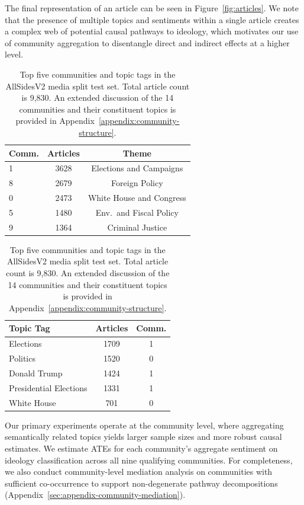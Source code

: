 The final representation of an article can be seen in Figure~\ref{fig:articles}. We note that the presence of multiple topics and sentiments within a single article creates a complex web of potential causal pathways to ideology, which motivates our use of community aggregation to disentangle direct and indirect effects at a higher level. 

\begin{table}[h]
    \centering
    \begin{minipage}{0.45\textwidth}
        \centering
        \small
        \begin{tabular}{lcc}
        \toprule
        \textbf{Comm.} & \textbf{Articles}  & \textbf{Theme} \\
        \midrule
        1 & 3628  & Elections and Campaigns \\
        8 & 2679  & Foreign Policy \\
        0 & 2473  & White House and Congress \\
        5 & 1480  & Env.\ and Fiscal Policy \\
        9 & 1364  & Criminal Justice \\
        \bottomrule
        \end{tabular}
    \end{minipage}
    \hfill
    \begin{minipage}{0.45\textwidth}
        \centering
        \small
        \begin{tabular}{lcc}
        \toprule
        \textbf{Topic Tag} & \textbf{Articles} & \textbf{Comm.} \\
        \midrule
        Elections & 1709 & 1 \\
        Politics & 1520 & 0 \\
        Donald Trump & 1424 & 1 \\
        Presidential Elections & 1331 & 1 \\
        White House & 701 & 0 \\
        \bottomrule
        \end{tabular}
    \end{minipage}
    \caption{Top five communities and topic tags in the AllSidesV2 media split test set. Total article count is 9,830. An extended discussion of the 14 communities and their constituent topics is provided in Appendix~\ref{appendix:community-structure}.}
    \label{tab:topical-summary}
\end{table}

Our primary experiments operate at the community level, where aggregating semantically related topics yields larger sample sizes and more robust causal estimates. We estimate ATEs for each community's aggregate sentiment on ideology classification across all nine qualifying communities. For completeness, we also conduct community-level mediation analysis on communities with sufficient co-occurrence to support non-degenerate pathway decompositions (Appendix~\ref{sec:appendix-community-mediation}).

